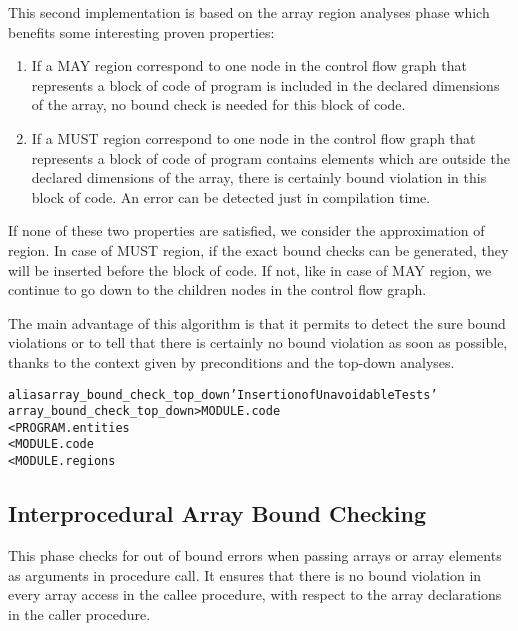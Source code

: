 \documentclass[a4paper]{report}
\newenvironment{PipsMake}{\begin{alltt}}{\end{alltt}}
\newenvironment{PipsPass}[1]{\label{pass:#1}}{}
\begin{document}
\begin{PipsPass}{array_bound_check_top_down}
This second implementation is based on the array region analyses phase which benefits some interesting proven properties:

\begin{enumerate}

\item If a MAY region correspond to one node in the control flow graph
  that represents a block of code of program is included in the
  declared dimensions of the array, no bound check is needed for this
  block of code.

\item If a MUST region correspond to one node in the control
  flow graph that represents a block of code of program contains elements
  which are outside the declared dimensions of the  array, there is
  certainly bound violation in this block of code. An error can be
  detected just in compilation time.

\end{enumerate}

If none of these two properties are satisfied, we consider the
approximation of region. In case of MUST region, if the exact bound checks
can be generated, they will be inserted before the block of code. If not,
like in case of MAY region, we continue to go down to the children nodes
in the control flow graph.

 The main advantage
of this algorithm is that it permits to detect the sure bound violations
or to tell that there is certainly no bound violation as soon as
possible, thanks to the context given by preconditions and the top-down
analyses.
\end{PipsPass}

\begin{PipsMake}
alias array_bound_check_top_down 'Insertion of Unavoidable Tests'
array_bound_check_top_down   > MODULE.code
        < PROGRAM.entities
        < MODULE.code
        < MODULE.regions
\end{PipsMake}


\subsection{Interprocedural Array Bound Checking}
\label{subsection-array-bound-check_interprocedural}

\begin{PipsPass}{array_bound_check_interprocedural}
This phase checks for out of bound errors when passing arrays or array
elements as arguments in procedure call. It ensures that there is no bound
violation in every array access in the callee procedure, with respect to
the array declarations in the caller procedure.
\end{PipsPass}
\end{document}
